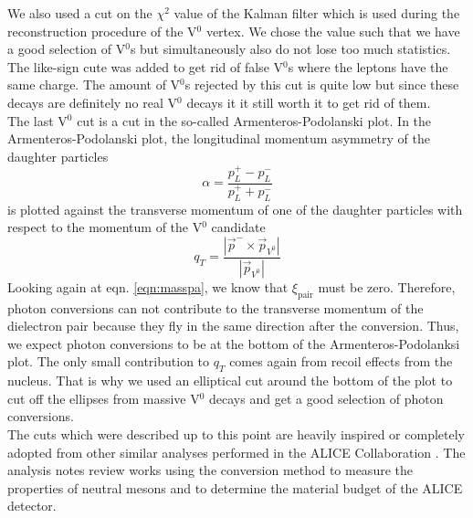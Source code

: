 We also used a cut on the $\chi^2$ value of the Kalman filter which is used during the reconstruction procedure of the V$^0$ vertex. We chose the value such that we have a good selection of V$^0$s but simultaneously also do not lose too much statistics. \\
The like-sign cute was added to get rid of false V$^0$s where the leptons have the same charge. The amount of V$^0$s rejected by this cut is quite low but since these decays are definitely no real V$^0$ decays it it still worth it to get rid of them. \\
The last V$^0$ cut is a cut in the so-called Armenteros-Podolanski plot. In the Armenteros-Podolanski plot, the longitudinal momentum asymmetry of the daughter particles
\begin{equation}
\alpha = \frac{p_L^{+} - p_L^{-}}{p_L^{+} + p_L^{-}}
\end{equation}
is plotted against the transverse momentum of one of the daughter particles with respect to the momentum of the V$^0$ candidate
\begin{equation}
q_T = \frac{|\vec{p}^{-} \times \vec{p}_{V^0}|}{|\vec{p}_{V^0}|}
\end{equation}
Looking again at eqn. \ref{eqn:masspa}, we know that $\xi_{\mathrm{pair}}$ must be zero. Therefore, photon conversions can not contribute to the transverse momentum of the dielectron pair because they fly in the same direction after the conversion. Thus, we expect photon conversions to be at the bottom of the Armenteros-Podolanksi plot. The only small contribution to $q_T$ comes again from recoil effects from the nucleus. That is why we used an elliptical cut around the bottom of the plot to cut off the ellipses from massive V$^0$ decays and get a good selection of photon conversions. \\
The cuts which were described up to this point are heavily inspired or completely adopted from other similar analyses performed in the ALICE Collaboration \cite{ananote1, ananote2}. The analysis notes review works using the conversion method to measure the properties of neutral mesons and to determine the material budget of the ALICE detector. \\
